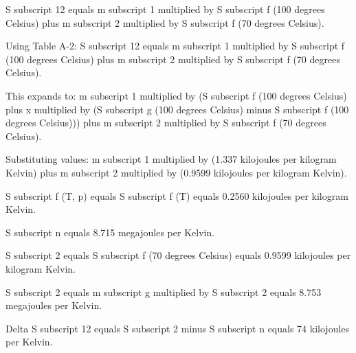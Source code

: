 S subscript 12 equals m subscript 1 multiplied by S subscript f (100 degrees Celsius) plus m subscript 2 multiplied by S subscript f (70 degrees Celsius).  

Using Table A-2:  
S subscript 12 equals m subscript 1 multiplied by S subscript f (100 degrees Celsius) plus m subscript 2 multiplied by S subscript f (70 degrees Celsius).  

This expands to:  
m subscript 1 multiplied by (S subscript f (100 degrees Celsius) plus x multiplied by (S subscript g (100 degrees Celsius) minus S subscript f (100 degrees Celsius))) plus m subscript 2 multiplied by S subscript f (70 degrees Celsius).  

Substituting values:  
m subscript 1 multiplied by (1.337 kilojoules per kilogram Kelvin) plus m subscript 2 multiplied by (0.9599 kilojoules per kilogram Kelvin).  

S subscript f (T, p) equals S subscript f (T) equals 0.2560 kilojoules per kilogram Kelvin.  

S subscript n equals 8.715 megajoules per Kelvin.  

S subscript 2 equals S subscript f (70 degrees Celsius) equals 0.9599 kilojoules per kilogram Kelvin.  

S subscript 2 equals m subscript g multiplied by S subscript 2 equals 8.753 megajoules per Kelvin.  

Delta S subscript 12 equals S subscript 2 minus S subscript n equals 74 kilojoules per Kelvin.